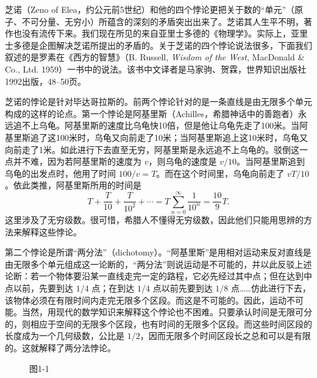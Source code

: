 芝诺（Zeno of Elea，约公元前5世纪）和他的四个悖论更把关于数的“单元”（原子、不可分量、无穷小）所蕴含的深刻的矛盾突出出来了。芝诺其人生平不明，著作也没有流传下来。我们现在所见的来自亚里士多德的《物理学》。实际上，亚里士多德是企图解决芝诺所提出的矛盾的。关于芝诺的四个悖论说法很多，下面我们叙述的是罗素在《西方的智慧》（B. Russell, \textit{Wisdom of the West}, MacDonald \& Co., Ltd. 1959）一书中的说法。该书中文译者是马家驹、贺霖，世界知识出版社1992出版，48--50页。

芝诺的悖论是针对毕达哥拉斯的。前两个悖论针对的是一条直线是由无限多个单元构成的这样的论点。第一个悖论是阿基里斯（Achilles，希腊神话中的善跑者）永远追不上乌龟。阿基里斯的速度比乌龟快10倍，但是他让乌龟先走了100米。当阿基里斯追了这100米时，乌龟又向前走了10米；当阿基里斯追上这10米时，乌龟又向前走了1米。如此进行下去直至无穷，阿基里斯是永远追不上乌龟的。驳倒这一点并不难，因为若阿基里斯的速度为 $v$，则乌龟的速度是 $v/10$。当阿基里斯追到乌龟的出发点时，他用了时间 $100/v=T$。而在这个时间里，乌龟向前走了 $vT/10$。依此类推，阿基里斯所用的时间是
\[
T+\frac{T}{10}+\frac{T}{10^2}+\cdots
=T\sum_{n=0}^{\infty}\frac{1}{10^n}
=\frac{10}{9}T.
\]
这里涉及了无穷级数。很可惜，希腊人不懂得无穷级数，因此他们只能用思辨的方法来解释这些悖论。

第二个悖论是所谓“两分法”（dichotomy）。“阿基里斯”是用相对运动来反对直线是由无限多个单元组成这一论断的，“两分法”则说运动是不可能的，并以此反驳上述论断：若一个物体要沿某一直线走完一定的路程，它必先经过其中点；但在达到中点以前，先要到达 $1/4$ 点；在到达 $1/4$ 点以前先要到达 $1/8$ 点……仿此进行下去，该物体必须在有限时间内走完无限多个区段。而这是不可能的。因此，运动不可能。当然，用现代的数学知识来解释这个悖论也不困难。只要承认时间是无限可分的，则相应于空间的无限多个区段，也有时间的无限多个区段。而这些时间区段的长度成为一个几何级数，公比是 $1/2$，因而无限多个时间区段长之总和可以是有限的。这就解释了两分法悖论。

\begin{figure}[htbp]
\centering
{}
\caption*{图1-1}
\end{figure}

